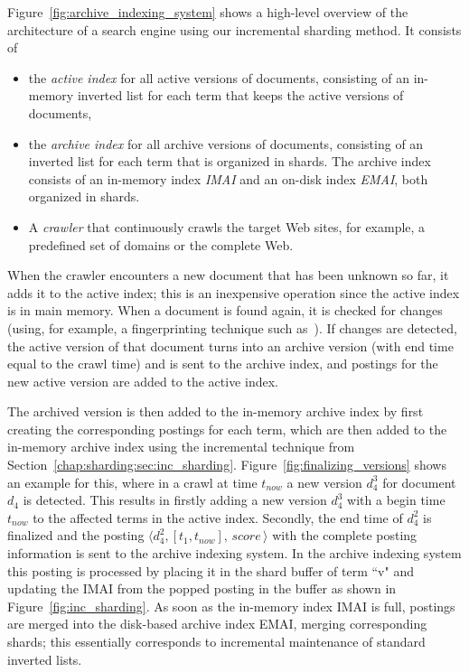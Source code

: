 Figure~\ref{fig:archive_indexing_system} shows a high-level overview
of the architecture of a search engine using our incremental sharding
method. It consists of
\begin{itemize}
\item the \emph{active index} for all active versions of documents,
  consisting of an in-memory inverted list for each term that keeps
  the active versions of documents,
\item the \emph{archive index} for all archive versions of documents,
  consisting of an inverted list for each term that is organized in
  shards. The archive index consists of an in-memory index \emph{IMAI}
  and an on-disk index \emph{EMAI}, both organized in shards.
\item A \emph{crawler} that continuously crawls the target Web sites,
  for example, a predefined set of domains or the complete Web.
\end{itemize}

When the crawler encounters a new document that has been unknown so
far, it adds it to the active index; this is an inexpensive operation
since the active index is in main memory. When a document is found
again, it is checked for changes (using, for example, a fingerprinting
technique such
as~\cite{DBLP:journals/cn/BroderGMZ97,DBLP:conf/sigir/Henzinger06}). If
changes are detected, the active version of that document turns into
an archive version (with end time equal to the crawl time) and is
sent to the archive index, and postings for the new active
version are added to the active index.

The archived version is then added to the in-memory archive index by
first creating the corresponding postings for each term, which are
then added to the in-memory archive index using the incremental
technique from
Section~\ref{chap:sharding:sec:inc_sharding}. Figure~\ref{fig:finalizing_versions}
shows an example for this, where in a crawl at time $t_{now}$ a new
version $d_4^3$ for document $d_4$ is detected. This results in firstly
adding a new version $d_4^3$ with a begin time $t_{now}$ to the
affected terms in the active index. Secondly, the end time of $d_4^2$ is
finalized and the posting $\langle d_4^2, [t_1, t_{now}], \, score
\,\rangle$ with the complete posting information is sent to the
archive indexing system. In the archive indexing system this posting
is processed by placing it in the shard buffer of term ``v" and
updating the IMAI from the popped posting in the buffer as shown in
Figure~\ref{fig:inc_sharding}. As soon as the in-memory index IMAI is
full, postings are merged into the disk-based archive index EMAI,
merging corresponding shards; this essentially corresponds to
incremental maintenance of standard inverted lists.

